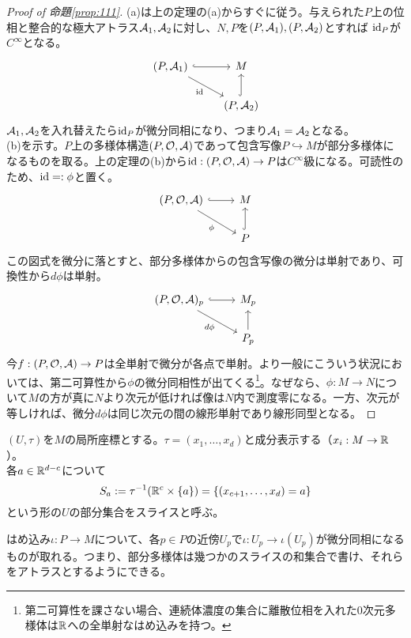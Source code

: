 \begin{proof}[Proof of 命題\ref{prop:111}]
    (a)は上の定理の(a)からすぐに従う。与えられた$P$上の位相と整合的な極大アトラス$\mathcal{A}_1,\mathcal{A}_2$に対し、$N,P$を$(P,\mathcal{A}_1),(P,\mathcal{A}_2)$とすれば $\mathrm{id}_P$が$C^\infty$となる。
    \[\begin{tikzcd}
        (P,\A_1)\arrow[r,hook]\arrow[dr,"\id"'] &M\\
	    & (P,\A_2)\arrow[u,hook]
    \end{tikzcd}\]
    $\mathcal{A}_1,\mathcal{A}_2$を入れ替えたら$\mathrm{id}_P$が微分同相になり、つまり$\mathcal{A}_1=\mathcal{A}_2$となる。\\
    (b)を示す。$P$上の多様体構造$(P,\mathcal{O},\mathcal{A})$であって包含写像$P\hookrightarrow M$が部分多様体になるものを取る。上の定理の(b)から$\mathrm{id}:(P,\mathcal{O},\mathcal{A})\to P$は$C^\infty$級になる。可読性のため、$\mathrm{id}=:\phi$と置く。
    \[\begin{tikzcd}
        (P,\O,\A)\arrow[r,hook]\arrow[dr,"\phi"'] &M\\
	    & P\arrow[u,hook]
    \end{tikzcd}\]
    この図式を微分に落とすと、部分多様体からの包含写像の微分は単射であり、可換性から$d\phi$は単射。
    \[\begin{tikzcd}
        (P,\O,\A)_p\arrow[r,hook]\arrow[dr,"d\phi"'] &M_p\\
	    & P_p\arrow[u]
    \end{tikzcd}\]
    今$f:(P,\mathcal{O},\mathcal{A})\to P$は全単射で微分が各点で単射。より一般にこういう状況においては、第二可算性から$\phi$の微分同相性が出てくる\footnote{第二可算性を課さない場合、連続体濃度の集合に離散位相を入れた0次元多様体は$\mathbb{R}$への全単射なはめ込みを持つ。}。なぜなら、$\phi:M\to N$について$M$の方が真に$N$より次元が低ければ像は$N$内で測度零になる。一方、次元が等しければ、微分$d\phi$は同じ次元の間の線形単射であり線形同型となる。
\end{proof}
\begin{defi}[スライス]
    $(U,\tau)$を$M$の局所座標とする。$\tau=(x_1,\dots,x_d)$と成分表示する（$x_i:M\to\mathbb{R}$）。\\
    各$a\in\mathbb{R}^{d-c}$について
    \[S_a:=\tau^{-1}(\mathbb{R}^c\times\{a\})=\{(x_{c+1},\dots,x_d)=a\}\]
    という形の$U$の部分集合をスライスと呼ぶ。
\end{defi}
\begin{prop}[はめ込みは局所的にスライス]\label{prop:112}
    はめ込み$\iota:P\to M$について、各$p\in P$の近傍$U_p$で$\iota:U_p\to\iota(U_p)$が微分同相になるものが取れる。つまり、部分多様体は幾つかのスライスの和集合で書け、それらをアトラスとするようにできる。
\end{prop}

